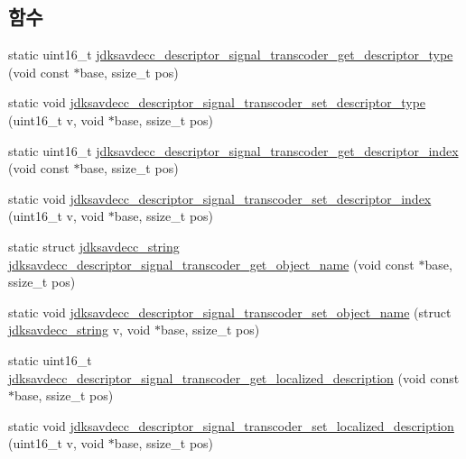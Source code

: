 \subsection*{함수}
\begin{DoxyCompactItemize}
\item 
static uint16\+\_\+t \hyperlink{group__descriptor__transcoder_ga8097241417c86bf8cfbeb06f7b1b0b7b}{jdksavdecc\+\_\+descriptor\+\_\+signal\+\_\+transcoder\+\_\+get\+\_\+descriptor\+\_\+type} (void const $\ast$base, ssize\+\_\+t pos)
\item 
static void \hyperlink{group__descriptor__transcoder_ga3a49a893b88a2bd389d9056bfb4f4637}{jdksavdecc\+\_\+descriptor\+\_\+signal\+\_\+transcoder\+\_\+set\+\_\+descriptor\+\_\+type} (uint16\+\_\+t v, void $\ast$base, ssize\+\_\+t pos)
\item 
static uint16\+\_\+t \hyperlink{group__descriptor__transcoder_gaa9f83dde99db2fc87750e5279f44749b}{jdksavdecc\+\_\+descriptor\+\_\+signal\+\_\+transcoder\+\_\+get\+\_\+descriptor\+\_\+index} (void const $\ast$base, ssize\+\_\+t pos)
\item 
static void \hyperlink{group__descriptor__transcoder_ga40ad1db774d31dc33d468fea89de38c7}{jdksavdecc\+\_\+descriptor\+\_\+signal\+\_\+transcoder\+\_\+set\+\_\+descriptor\+\_\+index} (uint16\+\_\+t v, void $\ast$base, ssize\+\_\+t pos)
\item 
static struct \hyperlink{structjdksavdecc__string}{jdksavdecc\+\_\+string} \hyperlink{group__descriptor__transcoder_gaa5935b90e69fb14206e774132e705472}{jdksavdecc\+\_\+descriptor\+\_\+signal\+\_\+transcoder\+\_\+get\+\_\+object\+\_\+name} (void const $\ast$base, ssize\+\_\+t pos)
\item 
static void \hyperlink{group__descriptor__transcoder_gafbe8f98985c2ef583819b330cc0bd44e}{jdksavdecc\+\_\+descriptor\+\_\+signal\+\_\+transcoder\+\_\+set\+\_\+object\+\_\+name} (struct \hyperlink{structjdksavdecc__string}{jdksavdecc\+\_\+string} v, void $\ast$base, ssize\+\_\+t pos)
\item 
static uint16\+\_\+t \hyperlink{group__descriptor__transcoder_gad1755f3c362f3775331e6edd818212d9}{jdksavdecc\+\_\+descriptor\+\_\+signal\+\_\+transcoder\+\_\+get\+\_\+localized\+\_\+description} (void const $\ast$base, ssize\+\_\+t pos)
\item 
static void \hyperlink{group__descriptor__transcoder_gaf0a1a3c7bab2f8cc0cb5fd1e2094553a}{jdksavdecc\+\_\+descriptor\+\_\+signal\+\_\+transcoder\+\_\+set\+\_\+localized\+\_\+description} (uint16\+\_\+t v, void $\ast$base, ssize\+\_\+t pos)
\item 

\end{DoxyCompactItemize}
